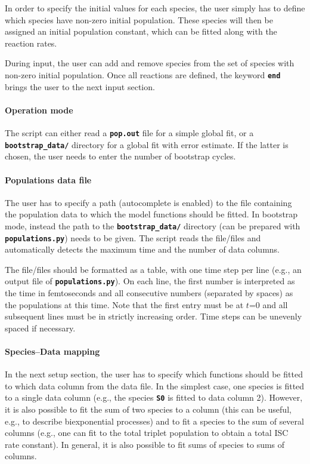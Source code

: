 \documentclass[a4paper,10pt,DIV=15,openany]{scrbook}
\newcommand{\ttt}[1]{\textbf{\texttt{#1}}}
\begin{document}
In order to specify the initial values for each species, the user simply has to define which species have non-zero initial population.
These species will then be assigned an initial population constant, which can be fitted along with the reaction rates.

During input, the user can add and remove species from the set of species with non-zero initial population.
Once all reactions are defined, the keyword \ttt{end} brings the user to the next input section.

\paragraph{Operation mode}

The script can either read a \ttt{pop.out} file for a simple global fit, or a \ttt{bootstrap\_data/} directory for a global fit with error estimate.
If the latter is chosen, the user needs to enter the number of bootstrap cycles.


\paragraph{Populations data file}

The user has to specify a path (autocomplete is enabled) to the file containing the population data to which the model functions should be fitted.
In bootstrap mode, instead the path to the \ttt{bootstrap\_data/} directory (can be prepared with \ttt{populations.py}) needs to be given.
The script reads the file/files and automatically detects the maximum time and the number of data columns.

The file/files should be formatted as a table, with one time step per line (e.g., an output file of \ttt{populations.py}). 
On each line, the first number is interpreted as the time in femtoseconds and all consecutive numbers (separated by spaces) as the populations at this time.
Note that the first entry must be at $t$=0 and all subsequent lines must be in strictly increasing order.
Time steps can be unevenly spaced if necessary.

\paragraph{Species--Data mapping}

In the next setup section, the user has to specify which functions should be fitted to which data column from the data file.
In the simplest case, one species is fitted to a single data column (e.g., the species \ttt{S0} is fitted to data column 2).
However, it is also possible to fit the sum of two species to a column (this can be useful, e.g., to describe biexponential processes) and to fit a species to the sum of several columns (e.g., one can fit to the total triplet population to obtain a total ISC rate constant).
In general, it is also possible to fit sums of species to sums of columns.
\end{document}
